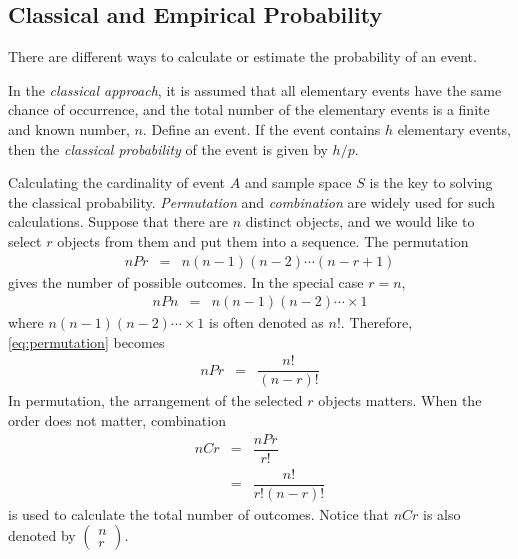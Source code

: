 \subsection{Classical and Empirical Probability}

There are different ways to calculate or estimate the probability of an event. 

In the \textit{classical approach}, it is assumed that all elementary events have the same chance of occurrence, and the total number of the elementary events is a finite and known number, $n$. Define an event. If the event contains $h$ elementary events, then the \textit{classical probability} of the event is given by $h/p$.

Calculating the cardinality of event $A$ and sample space $S$ is the key to solving the classical probability. \textit{Permutation} and \textit{combination} are widely used for such calculations. Suppose that there are $n$ distinct objects, and we would like to select $r$ objects from them and put them into a sequence. The permutation
\begin{eqnarray}
  nPr &=& n(n-1)(n-2)\cdots (n-r+1) \label{eq:permutation}
\end{eqnarray}
gives the number of possible outcomes. In the special case $r=n$,
\begin{eqnarray}
  nPn &=& n(n-1)(n-2)\cdots \times 1 \nonumber
\end{eqnarray}
where $n(n-1)(n-2)\cdots \times 1$ is often denoted as $n!$. Therefore, \eqref{eq:permutation} becomes
\begin{eqnarray}
  nPr &=& \dfrac{n!}{(n-r)!} \nonumber
\end{eqnarray}
In permutation, the arrangement of the selected $r$ objects matters. When the order does not matter, combination
\begin{eqnarray}
  nCr &=& \dfrac{nPr}{r!} \nonumber \\
  &=& \dfrac{n!}{r!(n-r)!} \nonumber
\end{eqnarray}
is used to calculate the total number of outcomes. Notice that $nCr$ is also denoted by $\left(\begin{array}{c}
                                                                                           n \\
                                                                                           r
                                                                                         \end{array}\right)$.

